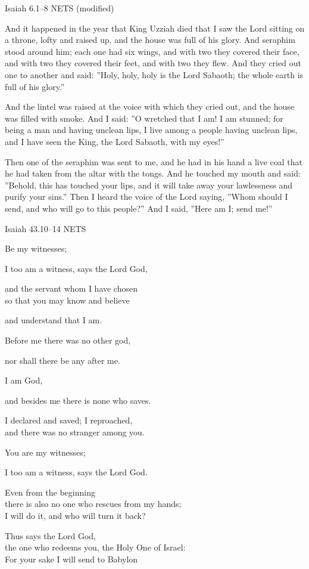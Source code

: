 \documentclass[
]{article}
\newcommand{\RL}[1]{\beginR #1\endR}
\begin{document}
Isaiah 6.1--8 NETS (modified)

And it happened in the year that King Uzziah died that I saw the Lord
sitting on a throne, lofty and raised up, and the house was full of his
glory. And seraphim stood around him; each one had six wings, and with
two they covered their face, and with two they covered their feet, and
with two they flew. And they cried out one to another and
said:\RL{\hfill\break
''}Holy, holy, holy is the Lord Sabaoth; the whole earth is full of his
glory.''

And the lintel was raised at the voice with which they cried out, and
the house was filled with smoke. And I said: \RL{''}O wretched that I
am! I am stunned; for being a man and having unclean lips, I live among
a people having unclean lips, and I have seen the King, the Lord
Sabaoth, with my eyes!''

Then one of the seraphim was sent to me, and he had in his hand a live
coal that he had taken from the altar with the tongs. And he touched my
mouth and said: \RL{''}Behold, this has touched your lips, and it will
take away your lawlessness and purify your sins.'' Then I heard the
voice of the Lord saying, \RL{''}Whom should I send, and who will go to
this people?'' And I said, \RL{''}Here am I; send me!''

Isaiah 43.10--14 NETS

Be my witnesses;

I too am a witness, says the Lord God,

and the servant whom I have chosen\\
so that you may know and believe

and understand that I am.

Before me there was no other god,

nor shall there be any after me.

I am God,

and besides me there is none who saves.

I declared and saved; I reproached,\\
and there was no stranger among you.

You are my witnesses;

I too am a witness, says the Lord God.

Even from the beginning\\
there is also no one who rescues from my hands;\\
I will do it, and who will turn it back?

Thus says the Lord God,\\
the one who redeems you, the Holy One of Israel:\\
For your sake I will send to Babylon
\end{document}
